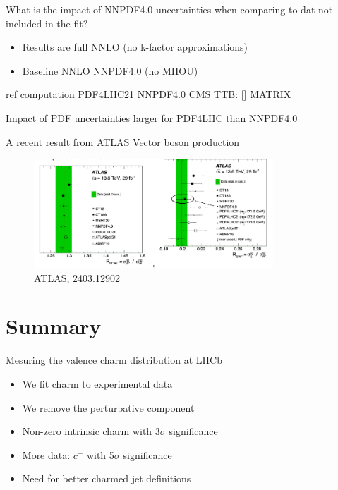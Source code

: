 \documentclass[aspectratio=43, 8pt,t]{beamer}
\begin{document}
\begin{frame}{What is the impact of NNPDF4.0 uncertainties when comparing to dat not included in the fit?}
  \begin{itemize}
    \item Results are full NNLO (no k-factor approximations)
    \item Baseline NNLO NNPDF4.0 (no MHOU)
  \end{itemize}

            ref   computation  PDF4LHC21   NNPDF4.0
  CMS TTB:  []    MATRIX

  Impact of PDF uncertainties larger for PDF4LHC than NNPDF4.0
\end{frame}

\begin{frame}{A recent result from ATLAS}
  Vector boson production
  \begin{figure}
    \includegraphics[width=0.8\textwidth]{atlas_vbf.png}
    \caption*{\color{gray}\footnotesize ATLAS, 2403.12902}
  \end{figure}
\end{frame}

\section{Summary}
\begin{frame}{Mesuring the valence charm distribution at LHCb}
  \begin{itemize}
    \item We fit charm to experimental data
    \item We remove the perturbative component
    \item Non-zero intrinsic charm with 3$\sigma$ significance
    \item More data: $c^+$ with 5$\sigma$ significance
    \item Need for better charmed jet definitions
  \end{itemize}

  \vspace*{5em}
\end{frame}
\end{document}
